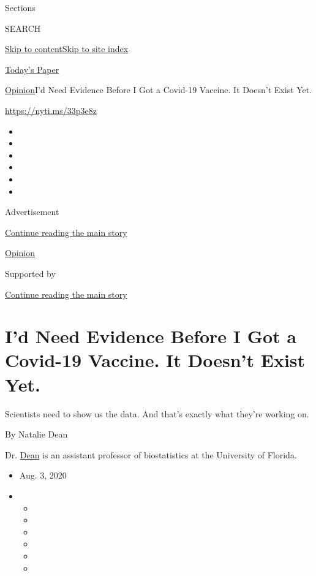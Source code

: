 Sections

SEARCH

\protect\hyperlink{site-content}{Skip to
content}\protect\hyperlink{site-index}{Skip to site index}

\href{https://myaccount.nytimes3xbfgragh.onion/auth/login?response_type=cookie\&client_id=vi}{}

\href{https://www.nytimes3xbfgragh.onion/section/todayspaper}{Today's
Paper}

\href{/section/opinion}{Opinion}\textbar{}I'd Need Evidence Before I Got
a Covid-19 Vaccine. It Doesn't Exist Yet.

\url{https://nyti.ms/33p3e8z}

\begin{itemize}
\item
\item
\item
\item
\item
\item
\end{itemize}

Advertisement

\protect\hyperlink{after-top}{Continue reading the main story}

\href{/section/opinion}{Opinion}

Supported by

\protect\hyperlink{after-sponsor}{Continue reading the main story}

\hypertarget{id-need-evidence-before-i-got-a-covid-19-vaccine-it-doesnt-exist-yet}{%
\section{I'd Need Evidence Before I Got a Covid-19 Vaccine. It Doesn't
Exist
Yet.}\label{id-need-evidence-before-i-got-a-covid-19-vaccine-it-doesnt-exist-yet}}

Scientists need to show us the data. And that's exactly what they're
working on.

By Natalie Dean

Dr. \href{https://www.nataliexdean.com/}{Dean} is an assistant professor
of biostatistics at the University of Florida.

\begin{itemize}
\item
  Aug. 3, 2020
\item
  \begin{itemize}
  \item
  \item
  \item
  \item
  \item
  \item
  \end{itemize}
\end{itemize}


